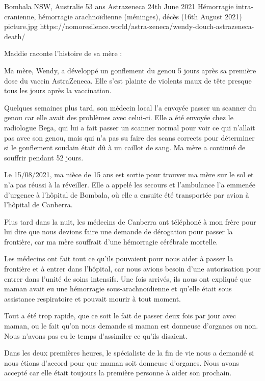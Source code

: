 {Bombala NSW, Australie}
{53 ans}
{Astrazeneca}
{24th June 2021}
{Hémorragie intra-cranienne, hémorragie arachnoïdienne (méninges), décès (16th August 2021)}
{picture.jpg}
{https://nomoresilence.world/astra-zeneca/wendy-douch-astrazeneca-death/}
{

\normalsize
  
Maddie raconte l'histoire de sa mère :

Ma mère, Wendy, a développé un gonflement du genou 5 jours après sa première
dose du vaccin AstraZeneca. Elle s'est plainte de violents maux de tête presque
tous les jours après la vaccination.

Quelques semaines plus tard, son médecin local l'a envoyée passer un scanner du
genou car elle avait des problèmes avec celui-ci. Elle a été envoyée chez le
radiologue Bega, qui lui a fait passer un scanner normal pour voir ce qui
n'allait pas avec son genou, mais qui n'a pas su faire des scans corrects pour
déterminer si le gonflement soudain était dû à un caillot de sang. Ma mère a
continué de souffrir pendant 52 jours.

Le 15/08/2021, ma nièce de 15 ans est sortie pour trouver ma mère sur le sol et
n'a pas réussi à la réveiller. Elle a appelé les secours et l'ambulance l'a
emmenée d'urgence à l'hôpital de Bombala, où elle a ensuite été transportée par
avion à l'hôpital de Canberra.

Plus tard dans la nuit, les médecins de Canberra ont téléphoné à mon frère pour
lui dire que nous devions faire une demande de dérogation pour passer la
frontière, car ma mère souffrait d'une hémorragie cérébrale mortelle.

Les médecins ont fait tout ce qu'ils pouvaient pour nous aider à passer la
frontière et à entrer dans l'hôpital, car nous avions besoin d'une autorisation
pour entrer dans l'unité de soins intensifs. Une fois arrivés, ils nous ont
expliqué que maman avait eu une hémorragie sous-arachnoïdienne et qu'elle était
sous assistance respiratoire et pouvait mourir à tout moment.

Tout a été trop rapide, que ce soit le fait de passer deux fois par jour avec
maman, ou le fait qu'on nous demande si maman est donneuse d'organes ou
non. Nous n'avons pas eu le temps d'assimiler ce qu'ils disaient.

Dans les deux premières heures, le spécialiste de la fin de vie nous a demandé
si nous étions d'accord pour que maman soit donneuse d'organes. Nous avons
accepté car elle était toujours la première personne à aider son prochain.

}
